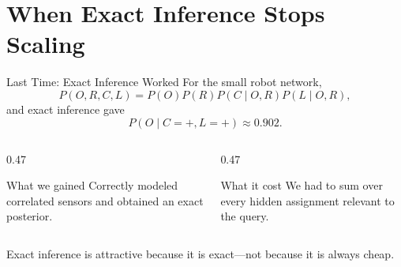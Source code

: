 \documentclass[aspectratio=169,10pt]{beamer}
\begin{document}

\makedecktitle

\section{When Exact Inference Stops Scaling}

\begin{frame}[shrink=10]{Last Time: Exact Inference Worked}
  For the small robot network,
  \[
    P(O,R,C,L)=P(O)P(R)P(C\mid O,R)P(L\mid O,R),
  \]
  and exact inference gave
  \[
    P(O\mid C=+,L=+)\approx 0.902.
  \]

  \begin{columns}[T,onlytextwidth]
    \begin{column}{0.47\textwidth}
      \begin{block}{What we gained}
        Correctly modeled correlated sensors and obtained an exact posterior.
      \end{block}
    \end{column}
    \begin{column}{0.47\textwidth}
      \begin{block}{What it cost}
        We had to sum over every hidden assignment relevant to the query.
      \end{block}
    \end{column}
  \end{columns}

  \begin{keyidea}
    Exact inference is attractive because it is exact---not because it is always cheap.
  \end{keyidea}
\end{frame}
\end{document}
